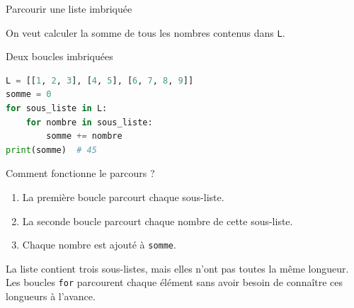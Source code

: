 \documentclass[10pt]{beamer}
\begin{document}
\begin{frame}[fragile]{Parcourir une liste imbriquée}

On veut calculer la somme de tous les nombres contenus dans \texttt{L}.

\begin{exampleblock}{Deux boucles imbriquées}
\begin{lstlisting}[language=Python]
L = [[1, 2, 3], [4, 5], [6, 7, 8, 9]]
somme = 0
for sous_liste in L:
    for nombre in sous_liste:
        somme += nombre
print(somme)  # 45
\end{lstlisting}
\end{exampleblock}

\pause

\begin{block}{Comment fonctionne le parcours ?}
\begin{enumerate}
    \item La première boucle parcourt chaque sous-liste.
    \item La seconde boucle parcourt chaque nombre de cette sous-liste.
    \item Chaque nombre est ajouté à \texttt{somme}.
\end{enumerate}
\end{block}

\pause

La liste contient trois sous-listes, mais elles n'ont pas toutes
la même longueur. Les boucles \texttt{for} parcourent chaque élément
sans avoir besoin de connaître ces longueurs à l'avance.
\end{frame}
\end{document}
